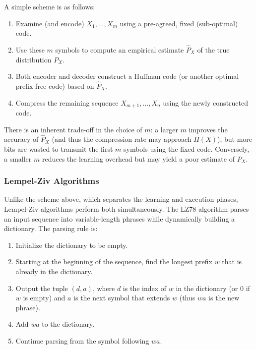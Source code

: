 A simple scheme is as follows:
\begin{enumerate}
    \item Examine (and encode) \(X_1,\dots,X_m\) using a pre-agreed, fixed (sub-optimal) code.
    \item Use these \(m\) symbols to compute an empirical estimate \(\hat{P}_X\) of the true distribution \(P_X\).
    \item Both encoder and decoder construct a Huffman code (or another optimal prefix-free code) based on \(\hat{P}_X\).
    \item Compress the remaining sequence \(X_{m+1},\dots,X_n\) using the newly constructed code.
\end{enumerate}

There is an inherent trade-off in the choice of \(m\): a larger \(m\) improves the accuracy of \(\hat{P}_X\) (and thus the compression rate may approach \(H(X)\)), but more bits are wasted to transmit the first \(m\) symbols using the fixed code. Conversely, a smaller \(m\) reduces the learning overhead but may yield a poor estimate of \(P_X\).

\subsubsection*{Lempel-Ziv Algorithms} \label{sec:lz}
Unlike the scheme above, which separates the learning and execution phases, Lempel-Ziv algorithms perform both simultaneously.
The LZ78 algorithm parses an input sequence into variable-length phrases while dynamically building a dictionary. The parsing rule is:
\begin{enumerate}
    \item Initialize the dictionary to be empty.
    \item Starting at the beginning of the sequence, find the longest prefix \(w\) that is already in the dictionary.
    \item Output the tuple \((d, a)\), where \(d\) is the index of \(w\) in the dictionary (or 0 if \(w\) is empty) and \(a\) is the next symbol that extends \(w\) (thus \(w a\) is the new phrase).
    \item Add \(w a\) to the dictionary.
    \item Continue parsing from the symbol following \(w a\).
\end{enumerate}

